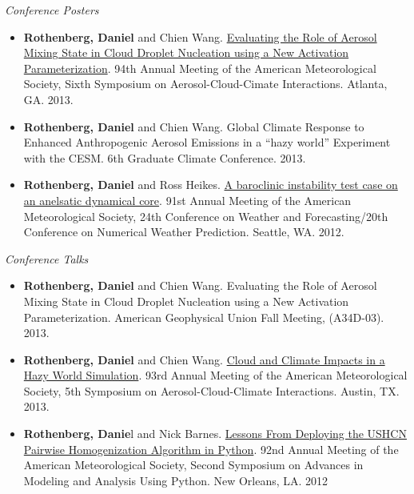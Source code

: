 \documentclass[12pt,letterpaper]{article}
\newcommand{\mhead}[1]{\leavevmode\marginpar{\sffamily\footnotesize #1}}
\begin{document}
\bigskip
\mhead{Presentations \newline and \newline Talks}%
\emph{Conference Posters} 
\medskip
\begin{itemize}[itemindent=-10pt]
 \item \textbf{Rothenberg, Daniel} and Chien Wang. \href{https://ams.confex.com/ams/94Annual/webprogram/Paper240205.html}{Evaluating the Role of Aerosol Mixing State in Cloud Droplet Nucleation using a New Activation Parameterization}. 94th Annual Meeting of the American Meteorological Society, Sixth Symposium on Aerosol-Cloud-Cimate Interactions. Atlanta, GA. 2013.
 
 \item \textbf{Rothenberg, Daniel} and Chien Wang. Global Climate Response to Enhanced Anthropogenic Aerosol Emissions in a “hazy world” Experiment with the CESM. 6th Graduate Climate Conference. 2013.
 
 \item \textbf{Rothenberg, Daniel} and Ross Heikes. \href{https://ams.confex.com/ams/91Annual/webprogram/Paper180796.html}{A baroclinic instability test case on an anelsatic dynamical core}. 91st Annual Meeting of the American Meteorological Society, 24th Conference on Weather and Forecasting/20th Conference on Numerical Weather Prediction. Seattle, WA. 2012.
\end{itemize}

\medskip
\emph{Conference Talks}
\medskip
\begin{itemize}[itemindent=-10pt]
 \item \textbf{Rothenberg, Daniel} and Chien Wang. Evaluating the Role of Aerosol Mixing State in Cloud Droplet Nucleation using a New Activation Parameterization. American Geophysical Union Fall Meeting, (A34D-03). 2013.
 
 \item \textbf{Rothenberg, Daniel} and Chien Wang. \href{http://figshare.com/articles/AMS_2014_Evaluating_the_Role_of_Aerosol_Mixing_State_in_Cloud_Droplet_Nucleation_towards_Developing_a_New_Activation_Parameterization/918655}{Cloud and Climate Impacts in a Hazy World Simulation}. 93rd Annual Meeting of the American Meteorological Society, 5th Symposium on Aerosol-Cloud-Climate Interactions. Austin, TX. 2013.
 
 \item \textbf{Rothenberg, Danie}l and Nick Barnes. \href{https://ams.confex.com/ams/92Annual/webprogram/Paper198219.html}{Lessons From Deploying the USHCN Pairwise Homogenization Algorithm in Python}. 92nd Annual Meeting of the American Meteorological Society, Second Symposium on Advances in Modeling and Analysis Using Python. New Orleans, LA. 2012
\end{itemize}
\end{document}
